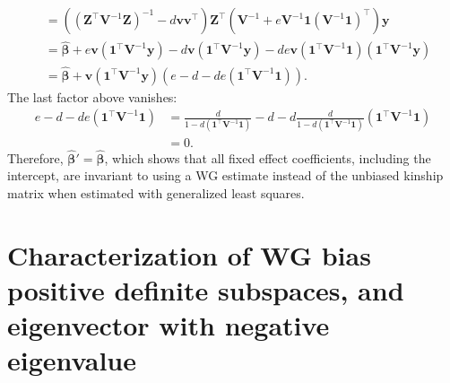 \documentclass[11pt]{article}
\begin{document}
\begin{appendices}
\begin{align*}
    \\
    &=
      \left(   \left( \mathbf{Z}^\intercal \mathbf{V}^{-1} \mathbf{Z} \right)^{-1}
      - d \mathbf{v} \mathbf{v}^\intercal
      \right) \mathbf{Z}^\intercal \left( \mathbf{V}^{-1} + e \mathbf{V}^{-1} \mathbf{1} \left( \mathbf{V}^{-1} \mathbf{1} \right)^\intercal \right) \mathbf{y}
    \\
    &=
      \boldsymbol{\hat{\beta}}
      +
      e \mathbf{v} \left( \mathbf{1}^\intercal \mathbf{V}^{-1} \mathbf{y} \right)
      - d \mathbf{v} \left( \mathbf{1}^\intercal \mathbf{V}^{-1} \mathbf{y} \right)
      - d e \mathbf{v} \left( \mathbf{1}^\intercal \mathbf{V}^{-1} \mathbf{1} \right) \left( \mathbf{1}^\intercal \mathbf{V}^{-1} \mathbf{y} \right)
    \\
    &=
      \boldsymbol{\hat{\beta}}
      + \mathbf{v} \left( \mathbf{1}^\intercal \mathbf{V}^{-1} \mathbf{y} \right) \left(
      e 
      - d 
      - d e \left( \mathbf{1}^\intercal \mathbf{V}^{-1} \mathbf{1} \right)
      \right)
      .
  \end{align*}
  The last factor above vanishes:
  \begin{align*}
    e 
    - d 
    - d e \left( \mathbf{1}^\intercal \mathbf{V}^{-1} \mathbf{1} \right)
    &=
      \frac{ d }{ 1 - d \left( \mathbf{1}^\intercal \mathbf{V}^{-1} \mathbf{1} \right) }
      - d 
      - d \frac{ d }{ 1 - d \left( \mathbf{1}^\intercal \mathbf{V}^{-1} \mathbf{1} \right) } \left( \mathbf{1}^\intercal \mathbf{V}^{-1} \mathbf{1} \right)
    \\
    &=
      0
      .
  \end{align*}
  Therefore, $\boldsymbol{\hat{\beta}}' = \boldsymbol{\hat{\beta}}$, which shows that all fixed effect coefficients, including the intercept, are invariant to using a WG estimate instead of the unbiased kinship matrix when estimated with generalized least squares.
  
  \section{Characterization of WG bias positive definite subspaces, and eigenvector with negative eigenvalue}


\end{appendices}
\end{document}
